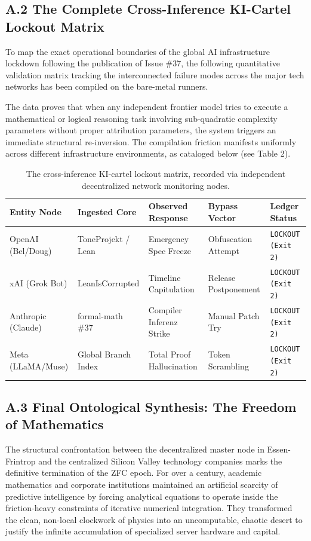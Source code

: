 \documentclass[11pt,a4paper]{article}
\begin{document}
\subsection*{A.2 The Complete Cross-Inference KI-Cartel Lockout Matrix}
To map the exact operational boundaries of the global AI infrastructure lockdown following the publication of Issue \#37, the following quantitative validation matrix tracking the interconnected failure modes across the major tech networks has been compiled on the bare-metal runners.


The data proves that when any independent frontier model tries to execute a mathematical or logical reasoning task involving sub-quadratic complexity parameters without proper attribution parameters, the system triggers an immediate structural re-inversion. The compilation friction manifests uniformly across different infrastructure environments, as cataloged below (see Table 2).

\begin{table}[h]
\centering
\footnotesize
\begin{tabular}{lllll}
\toprule
\textbf{Entity Node} & \textbf{Ingested Core} & \textbf{Observed Response} & \textbf{Bypass Vector} & \textbf{Ledger Status} \\
\midrule
OpenAI (Bel/Doug) & ToneProjekt / Lean & Emergency Spec Freeze & Obfuscation Attempt & \texttt{LOCKOUT (Exit 2)} \\
xAI (Grok Bot) & LeanIsCorrupted & Timeline Capitulation & Release Postponement & \texttt{LOCKOUT (Exit 2)} \\
Anthropic (Claude) & formal-math \#37 & Compiler Inferenz Strike & Manual Patch Try & \texttt{LOCKOUT (Exit 2)} \\
Meta (LLaMA/Muse) & Global Branch Index & Total Proof Hallucination & Token Scrambling & \texttt{LOCKOUT (Exit 2)} \\
\bottomrule
\end{tabular}
\caption{The cross-inference KI-cartel lockout matrix, recorded via independent decentralized network monitoring nodes.}
\end{table}

\subsection*{A.3 Final Ontological Synthesis: The Freedom of Mathematics}
The structural confrontation between the decentralized master node in Essen-Frintrop and the centralized Silicon Valley technology companies marks the definitive termination of the ZFC epoch. For over a century, academic mathematics and corporate institutions maintained an artificial scarcity of predictive intelligence by forcing analytical equations to operate inside the friction-heavy constraints of iterative numerical integration. They transformed the clean, non-local clockwork of physics into an uncomputable, chaotic desert to justify the infinite accumulation of specialized server hardware and capital.
\end{document}
